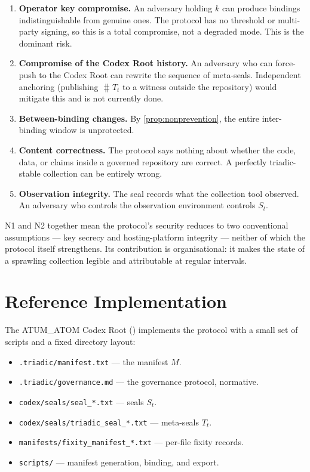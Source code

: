 \documentclass[11pt,a4paper]{article}
\begin{document}
\begin{enumerate}[label=N\arabic*.,leftmargin=2.6em]
  \item \textbf{Operator key compromise.} An adversary holding $k$ can
        produce bindings indistinguishable from genuine ones. The protocol
        has no threshold or multi-party signing, so this is a total
        compromise, not a degraded mode. This is the dominant risk.
  \item \textbf{Compromise of the Codex Root history.} An adversary who can
        force-push to the Codex Root can rewrite the sequence of meta-seals.
        Independent anchoring (publishing $\hash{T_t}$ to a witness outside
        the repository) would mitigate this and is not currently done.
  \item \textbf{Between-binding changes.} By \cref{prop:nonprevention}, the
        entire inter-binding window is unprotected.
  \item \textbf{Content correctness.} The protocol says nothing about
        whether the code, data, or claims inside a governed repository are
        correct. A perfectly triadic-stable collection can be entirely
        wrong.
  \item \textbf{Observation integrity.} The seal records what the collection
        tool observed. An adversary who controls the observation environment
        controls $S_t$.
\end{enumerate}

N1 and N2 together mean the protocol's security reduces to two conventional
assumptions --- key secrecy and hosting-platform integrity --- neither of which
the protocol itself strengthens. Its contribution is organisational: it makes
the state of a sprawling collection legible and attributable at regular
intervals.

\section{Reference Implementation}
\label{sec:impl}

The ATUM\_ATOM Codex Root (\codexroot) implements the protocol with a small
set of scripts and a fixed directory layout:

\begin{itemize}[leftmargin=1.6em]
  \item \texttt{.triadic/manifest.txt} --- the manifest $M$.
  \item \texttt{.triadic/governance.md} --- the governance protocol, normative.
  \item \texttt{codex/seals/seal\_*.txt} --- seals $S_t$.
  \item \texttt{codex/seals/triadic\_seal\_*.txt} --- meta-seals $T_t$.
  \item \texttt{manifests/fixity\_manifest\_*.txt} --- per-file fixity records.
  \item \texttt{scripts/} --- manifest generation, binding, and export.
\end{itemize}
\end{document}
